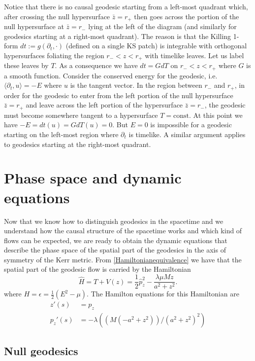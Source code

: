 Notice that there is no
causal geodesic starting from a left-most quadrant 
which, after  crossing 
the null hypersurface $\bar z=r_+$ then
goes across the portion of the null hypersurface at $\bar z=r_-$ 
lying at the left of the diagram (and similarly for geodesics starting
at a  right-most quadrant). The
reason is that  the Killing 1-form 
$dt := g(\partial_t,\cdot)$ (defined on a single \gls{KS} patch) is integrable with
orthogonal hypersurfaces foliating the region $r_{-} < z < r_{+}$
with timelike leaves. Let us label these leaves by $T$. As a
consequence we have $dt = G d T$ on $r_{-} < z < r_{+}$
where $G$ is a smooth function.
Consider the 
conserved energy for the geodesic, i.e. $ \langle \partial_t, u \rangle =-E $
where $u$ is the tangent vector. In the region between
$r_-$ and $ r_+$, in order for the geodesic to enter from the left portion of
the null hypersurface $\bar z= r_{+}$ and leave across the left portion
of the hypersurface $\bar z=r_{-}$, the geodesic must become somewhere tangent
to a hypersurface $T= \mbox{const}$. At this point we have $-E = dt (u) =
G dT (u) = 0$.
But $E=0$ is impossible for a geodesic starting on the left-most region
where $\partial_t$ is timelike. A similar argument applies to geodesics
starting at the right-most quadrant.

\section{Phase space and dynamic equations}

Now that we know how to distinguish geodesics in the spacetime and we understand how the causal structure of the spacetime works and which kind of flows can be expected, we are ready to obtain the dynamic equations that describe the phase space of the spatial part of the geodesics in the axis of symmetry of the Kerr metric. From \cref{Hamiltonianequivalence} we have that the spatial part of the geodesic flow is carried by the Hamiltonian 
\begin{equation}
\hat{H}=T+V(z)=\frac{1}{2} \hat{p}_z^2 -\frac{ \lambda  \mu  M z}{a^2+z^2} .
\end{equation}
where $H=\epsilon=\frac{1}{2}(E^2-\mu)$. The Hamilton equations for this Hamiltonian are
\begin{align}
 z'(s)&= p_z  \label{Hamiltoneq1}\\
 p_z'(s)&=-\lambda (( M (-a^2 + z^2))/(a^2 + z^2)^2)\label{Hamiltoneq2}
\end{align}

\subsection{Null geodesics}


